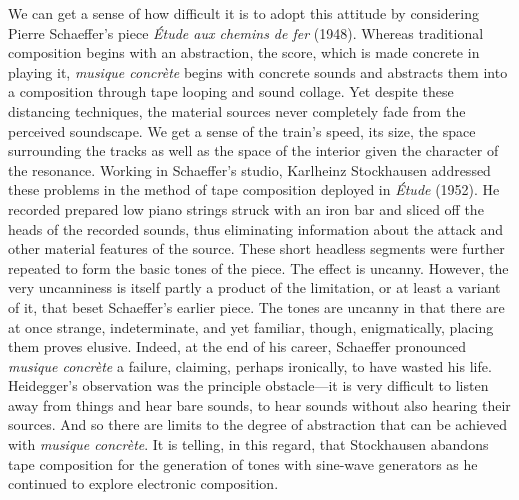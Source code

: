 We can get a sense of how difficult it is to adopt this attitude by considering Pierre Schaeffer's piece \emph{Étude aux chemins de fer} (1948). Whereas traditional composition begins with an abstraction, the score, which is made concrete in playing it, \emph{musique concrète} begins with concrete sounds and abstracts them into a composition through tape looping and sound collage. Yet despite these distancing techniques, the material sources never completely fade from the perceived soundscape. We get a sense of the train's speed, its size, the space surrounding the tracks as well as the space of the interior given the character of the resonance. Working in Schaeffer's studio, Karlheinz Stockhausen addressed these problems in the method of tape composition deployed in \emph{Étude} (1952). He recorded prepared low piano strings struck with an iron bar and sliced off the heads of the recorded sounds, thus eliminating information about the attack and other material features of the source. These short headless segments were further repeated to form the basic tones of the piece. The effect is uncanny. However, the very uncanniness is itself partly a product of the limitation, or at least a variant of it, that beset Schaeffer's earlier piece. The tones are uncanny in that there are at once strange, indeterminate, and yet familiar, though, enigmatically, placing them proves elusive. Indeed, at the end of his career, Schaeffer pronounced \emph{musique concrète} a failure, claiming, perhaps ironically, to have wasted his life. Heidegger's observation was the principle obstacle---it is very difficult to listen away from things and hear bare sounds, to hear sounds without also hearing their sources. And so there are limits to the degree of abstraction that can be achieved with \emph{musique concrète}. It is telling, in this regard, that Stockhausen abandons tape composition for the generation of tones with sine-wave generators as he continued to explore electronic composition.

